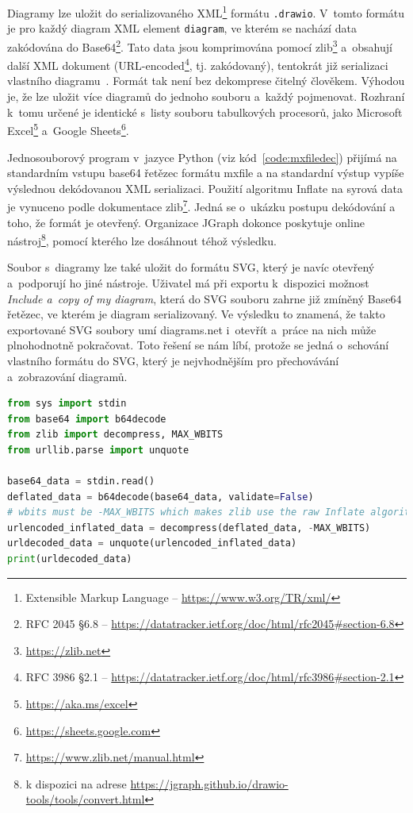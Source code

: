 Diagramy lze uložit do serializovaného XML\footnote{Extensible Markup Language -- \url{https://www.w3.org/TR/xml/}} formátu \texttt{.drawio}.
V~tomto formátu je pro každý diagram XML element \texttt{diagram}, ve kterém se nachází data zakódována do Base64\footnote{RFC 2045 \S6.8 -- \url{https://datatracker.ietf.org/doc/html/rfc2045\#section-6.8}}.
Tato data jsou komprimována pomocí zlib\footnote{\url{https://zlib.net}} a~obsahují další XML dokument (URL-encoded\footnote{RFC 3986 \S2.1 -- \url{https://datatracker.ietf.org/doc/html/rfc3986\#section-2.1}}, tj. zakódovaný), tentokrát již serializaci vlastního diagramu~\cite{seibert_extracting_2016}.
Formát tak není bez dekomprese čitelný člověkem.
Výhodou je, že lze uložit více diagramů do jednoho souboru a~každý pojmenovat.
Rozhraní k~tomu určené je identické s~listy souboru tabulkových procesorů, jako Microsoft Excel\footnote{\url{https://aka.ms/excel}} a~Google Sheets\footnote{\url{https://sheets.google.com}}.

Jednosouborový program v~jazyce Python (viz kód~\ref{code:mxfiledec}) přijímá na standardním vstupu base64 řetězec formátu mxfile a na standardní výstup vypíše výslednou dekódovanou XML serializaci.
Použití algoritmu Inflate na syrová data je vynuceno podle dokumentace zlib\footnote{\url{https://www.zlib.net/manual.html}}.
Jedná se o~ukázku postupu dekódování a toho, že formát je otevřený.
Organizace JGraph dokonce poskytuje online nástroj\footnote{k dispozici na adrese \url{https://jgraph.github.io/drawio-tools/tools/convert.html}}, pomocí kterého lze dosáhnout téhož výsledku.

Soubor s~diagramy lze také uložit do formátu SVG, který je navíc otevřený a~podporují ho jiné nástroje.
Uživatel má při exportu k~dispozici možnost \textit{Include a~copy of my diagram}, která do SVG souboru zahrne již zmíněný Base64 řetězec, ve kterém je diagram serializovaný.
Ve výsledku to znamená, že takto exportované SVG soubory umí diagrams.net i~otevřít a~práce na nich může plnohodnotně pokračovat.
Toto řešení se nám líbí, protože se jedná o~schování vlastního formátu do SVG, který je nejvhodnějším pro přechovávání a~zobrazování diagramů.

\begin{lstlisting}[language=Python, caption=Dekódování mxfile, label=code:mxfiledec, float=htb]
from sys import stdin
from base64 import b64decode
from zlib import decompress, MAX_WBITS
from urllib.parse import unquote

base64_data = stdin.read()
deflated_data = b64decode(base64_data, validate=False)
# wbits must be -MAX_WBITS which makes zlib use the raw Inflate algorithm without header detection
urlencoded_inflated_data = decompress(deflated_data, -MAX_WBITS)
urldecoded_data = unquote(urlencoded_inflated_data)
print(urldecoded_data)
\end{lstlisting}


